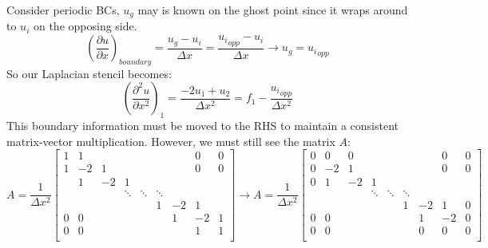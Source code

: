 \documentclass[landscape]{article}
\begin{document}
Consider periodic BCs, $u_g$ may is known on the ghost point since it wraps around to $u_i$ on the opposing side.
\begin{equation}
  \left(\frac{\partial u}{\partial x}\right)_{boundary}
  = \frac{u_g - u_i}{\Delta x} = \frac{{u_i}_{opp} - u_i}{\Delta x}
  \rightarrow
  u_g = {u_i}_{opp}
\end{equation}
So our Laplacian stencil becomes:
\begin{equation}
   \left(\frac{\partial^2 u}{\partial x^2}\right)_{1} =
   \frac{- 2 u_1 + u_{2}}{\Delta x^2} = f_1 - \frac{{u_i}_{opp}}{\Delta x^2}
\end{equation}
This boundary information must be moved to the RHS to maintain a consistent matrix-vector multiplication. However, we must still see the matrix $A$:
\[ A = \frac{1}{\Delta x^2} \left[\begin{array}{ccccccccc}
1  & 1     &           &           &           &           &           & 0       &  0 \\
1  & -2    & 1         &           &           &           &           & 0       &  0 \\
   & 1     & -2        & 1         &           &           &           &         &    \\
   &       &           & \ddots    & \ddots    & \ddots    &           &         &    \\
   &       &           &           &           & 1         & -2        & 1       &    \\
0  & 0     &           &           &           &           &  1        & -2      &  1 \\
0  & 0     &           &           &           &           &           & 1       &  1 \\
\end{array} \right]
\rightarrow
A = \frac{1}{\Delta x^2} \left[\begin{array}{ccccccccc}
0  & 0     & 0         &           &           &           &           & 0       &  0 \\
0  & -2    & 1         &           &           &           &           & 0       &  0 \\
0  & 1     & -2        & 1         &           &           &           &         &    \\
   &       &           & \ddots    & \ddots    & \ddots    &           &         &    \\
   &       &           &           &           & 1         & -2        & 1       &  0 \\
0  & 0     &           &           &           &           &  1        & -2      &  0 \\
0  & 0     &           &           &           &           &  0        & 0       &  0 \\
\end{array} \right]
\]
\end{document}
